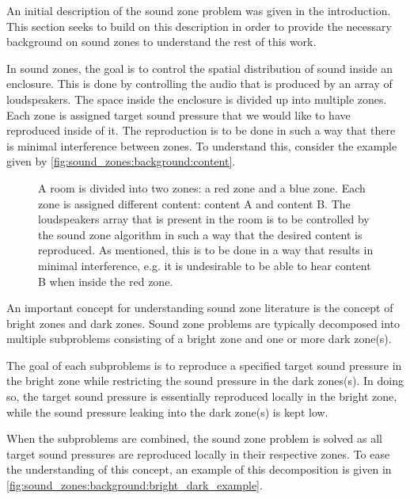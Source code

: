An initial description of the sound zone problem was given in the introduction.
This section seeks to build on this description in order to provide the necessary background on sound zones to 
understand the rest of this work.

In sound zones, the goal is to control the spatial distribution of sound inside an enclosure.
This is done by controlling the audio that is produced by an array of loudspeakers.
The space inside the enclosure is divided up into multiple zones.
Each zone is assigned target sound pressure that we would like to have reproduced inside of it.
The reproduction is to be done in such a way that there is minimal interference between zones.
To understand this, consider the example given by \autoref{fig:sound_zones:background:content}.

\begin{figure}[h]
    \centering
    \scalebox{1.0}{}
    \caption{A room is divided into two zones: a red zone and a blue zone.
        Each zone is assigned different content: content A and content B.
        The loudspeakers array that is present in the room is to be controlled by the sound zone algorithm 
        in such a way that the desired content is reproduced.
        As mentioned, this is to be done in a way that results in minimal interference, e.g. it is undesirable
        to be able to hear content B when inside the red zone.}
    \label{fig:sound_zones:background:content}
\end{figure}

An important concept for understanding sound zone literature is the concept of bright zones and dark zones.
Sound zone problems are typically decomposed into multiple subproblems consisting of a bright zone and 
one or more dark zone(s).

The goal of each subproblems is to reproduce a specified target sound pressure in the bright zone while restricting the 
sound pressure in the dark zones(s).
In doing so, the target sound pressure is essentially reproduced locally in the bright zone,
while the sound pressure leaking into the dark zone(s) is kept low.

When the subproblems are combined, the sound zone problem is solved as all target sound pressures 
are reproduced locally in their respective zones.
To ease the understanding of this concept, an example of this decomposition is given in 
\autoref{fig:sound_zones:background:bright_dark_example}.


